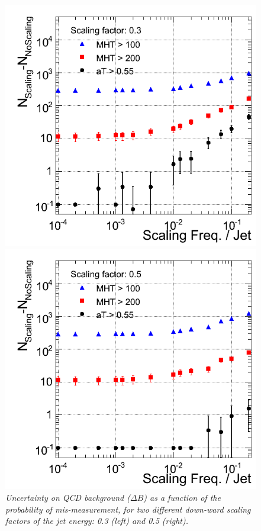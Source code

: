 \begin{figure}[h!]
\begin{minipage}[b]{0.5\linewidth}
\centering
\includegraphics[scale=0.37]{./plots/DNentries_Scale03.png} 
\end{minipage}
\begin{minipage}[b]{0.5\linewidth}
\centering
\includegraphics[scale=0.37]{./plots/DNentries_Scale05.png} 
\end{minipage}
\caption{\textit{Uncertainty on QCD background ($\Delta B$) as a function of the probability of mis-measurement, for two different down-ward scaling factors of the jet energy: 0.3 (left) and 0.5 (right).  } }
\label{fig:scale3}
\end{figure}
